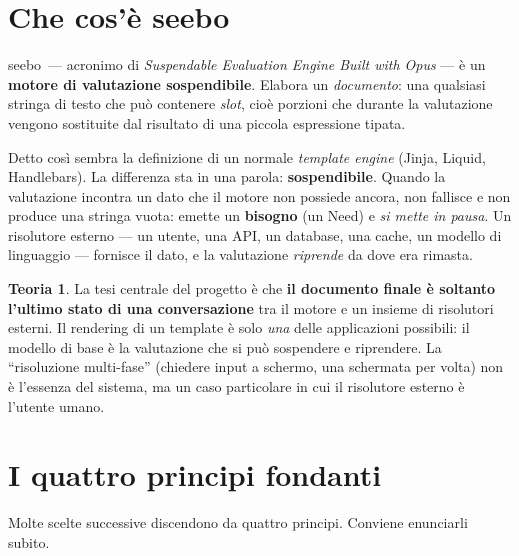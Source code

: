 \documentclass[11pt,a4paper]{book}
\newcommand{\ic}[1]{{\ttfamily #1}}
\theoremstyle{definition}
\newtheorem*{teoria}{Teoria}
\newcommand{\seebo}{\textsf{seebo}}
\begin{document}
\section{Che cos'è seebo}

\seebo\ --- acronimo di \emph{Suspendable Evaluation Engine Built with Opus} ---
è un \textbf{motore di valutazione sospendibile}. Elabora un \emph{documento}:
una qualsiasi stringa di testo che può contenere \emph{slot}, cioè porzioni che
durante la valutazione vengono sostituite dal risultato di una piccola
espressione tipata.

Detto così sembra la definizione di un normale \emph{template engine} (Jinja,
Liquid, Handlebars). La differenza sta in una parola: \textbf{sospendibile}.
Quando la valutazione incontra un dato che il motore non possiede ancora, non
fallisce e non produce una stringa vuota: emette un \textbf{bisogno} (un
\ic{Need}) e \emph{si mette in pausa}. Un risolutore esterno --- un utente, una
API, un database, una cache, un modello di linguaggio --- fornisce il dato, e la
valutazione \emph{riprende} da dove era rimasta.

\begin{teoria}
La tesi centrale del progetto è che \textbf{il documento finale è soltanto
l'ultimo stato di una conversazione} tra il motore e un insieme di risolutori
esterni. Il rendering di un template è solo \emph{una} delle applicazioni
possibili: il modello di base è la valutazione che si può sospendere e riprendere.
La ``risoluzione multi-fase'' (chiedere input a schermo, una schermata per volta)
non è l'essenza del sistema, ma un caso particolare in cui il risolutore esterno
è l'utente umano.
\end{teoria}

\section{I quattro principi fondanti}

Molte scelte successive discendono da quattro principi. Conviene enunciarli
subito.
\end{document}
